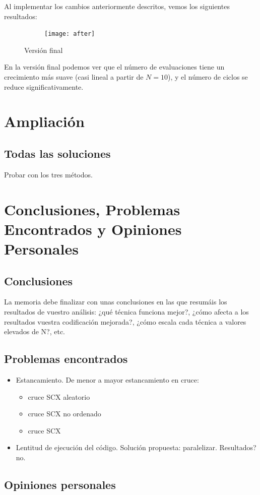 \documentclass[12pt]{article}
\begin{document}
Al implementar los cambios anteriormente descritos, vemos los siguientes resultados:

\begin{figure}[h]
    \center
    \begin{subfigure}{.50\textwidth}
        \texttt{[image: after]}
    \end{subfigure}
    \caption{Versión final}
\end{figure}

En la versión final podemos ver que el número de evaluaciones tiene un crecimiento más suave (casi lineal a partir de $N=10$), y el número de ciclos se reduce significativamente.

\newpage

\section{Ampliación}

\subsection{Todas las soluciones}

Probar con los tres métodos.

\section{Conclusiones, Problemas Encontrados y Opiniones Personales}

\subsection{Conclusiones}

La memoria debe finalizar con unas conclusiones en las que resumáis los resultados de vuestro análisis: ¿qué técnica funciona mejor?, ¿cómo afecta a los resultados vuestra codificación mejorada?, ¿cómo escala cada técnica a valores elevados de N?, etc.

\subsection{Problemas encontrados}
\begin{itemize}
    \item Estancamiento. De menor a mayor estancamiento en cruce:
    \begin{itemize}
        \item cruce SCX aleatorio
        \item cruce SCX no ordenado
        \item cruce SCX
    \end{itemize}
    \item Lentitud de ejecución del código. Solución propuesta: paralelizar. Resultados? no.
\end{itemize}

\subsection{Opiniones personales}
\end{document}
